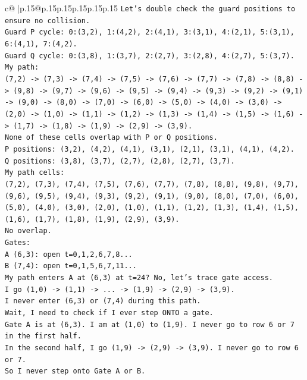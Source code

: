 \documentclass{article}
\begin{document}
{\begin{supertabular}{c@{$\;$}|p{.15\linewidth}@{}p{.15\linewidth}p{.15\linewidth}p{.15\linewidth}p{.15\linewidth}p{.15\linewidth}}
{{{\texttt{Let's double check the guard positions to ensure no collision.} \\
\texttt{Guard P cycle: 0:(3,2), 1:(4,2), 2:(4,1), 3:(3,1), 4:(2,1), 5:(3,1), 6:(4,1), 7:(4,2).} \\
\texttt{Guard Q cycle: 0:(3,8), 1:(3,7), 2:(2,7), 3:(2,8), 4:(2,7), 5:(3,7).} \\
\texttt{My path:} \\
\texttt{(7,2) {-}> (7,3) {-}> (7,4) {-}> (7,5) {-}> (7,6) {-}> (7,7) {-}> (7,8) {-}> (8,8) {-}> (9,8) {-}> (9,7) {-}> (9,6) {-}> (9,5) {-}> (9,4) {-}> (9,3) {-}> (9,2) {-}> (9,1) {-}> (9,0) {-}> (8,0) {-}> (7,0) {-}> (6,0) {-}> (5,0) {-}> (4,0) {-}> (3,0) {-}> (2,0) {-}> (1,0) {-}> (1,1) {-}> (1,2) {-}> (1,3) {-}> (1,4) {-}> (1,5) {-}> (1,6) {-}> (1,7) {-}> (1,8) {-}> (1,9) {-}> (2,9) {-}> (3,9).} \\
\texttt{None of these cells overlap with P or Q positions.} \\
\texttt{P positions: (3,2), (4,2), (4,1), (3,1), (2,1), (3,1), (4,1), (4,2).} \\
\texttt{Q positions: (3,8), (3,7), (2,7), (2,8), (2,7), (3,7).} \\
\texttt{My path cells:} \\
\texttt{(7,2), (7,3), (7,4), (7,5), (7,6), (7,7), (7,8), (8,8), (9,8), (9,7), (9,6), (9,5), (9,4), (9,3), (9,2), (9,1), (9,0), (8,0), (7,0), (6,0), (5,0), (4,0), (3,0), (2,0), (1,0), (1,1), (1,2), (1,3), (1,4), (1,5), (1,6), (1,7), (1,8), (1,9), (2,9), (3,9).} \\
\texttt{No overlap.} \\
\texttt{Gates:} \\
\texttt{A (6,3): open t=0,1,2,6,7,8...} \\
\texttt{B (7,4): open t=0,1,5,6,7,11...} \\
\texttt{My path enters A at (6,3) at t=24? No, let's trace gate access.} \\
\texttt{I go (1,0) {-}> (1,1) {-}> ... {-}> (1,9) {-}> (2,9) {-}> (3,9).} \\
\texttt{I never enter (6,3) or (7,4) during this path.} \\
\texttt{Wait, I need to check if I ever step ONTO a gate.} \\
\texttt{Gate A is at (6,3). I am at (1,0) to (1,9). I never go to row 6 or 7 in the first half.} \\
\texttt{In the second half, I go (1,9) {-}> (2,9) {-}> (3,9). I never go to row 6 or 7.} \\
\texttt{So I never step onto Gate A or B.} \\
}}}
\end{supertabular}}
\end{document}
